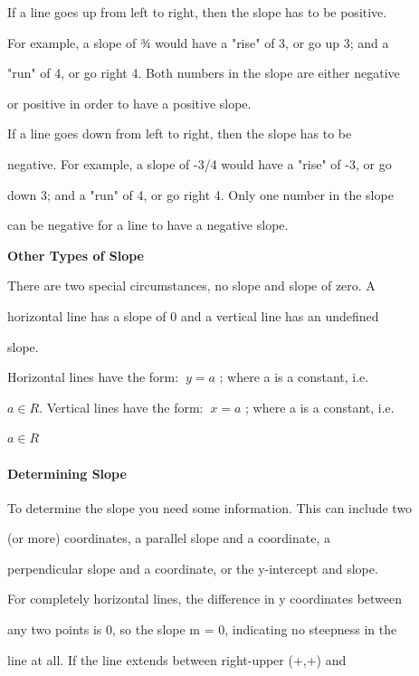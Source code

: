 If a line goes up from left to right, then the slope has to be positive.

For example, a slope of ¾ would have a "rise" of 3, or go up 3; and a

"run" of 4, or go right 4. Both numbers in the slope are either negative

or positive in order to have a positive slope.



If a line goes down from left to right, then the slope has to be

negative. For example, a slope of -3/4 would have a "rise" of -3, or go

down 3; and a "run" of 4, or go right 4. Only one number in the slope

can be negative for a line to have a negative slope.



\textbf{Other Types of Slope}



There are two special circumstances, no slope and slope of zero. A

horizontal line has a slope of 0 and a vertical line has an undefined

slope.



Horizontal lines have the form: $\ y = a$ ; where a is a constant, i.e.

$a \in R$. Vertical lines have the form: $\ x = a$ ; where a is a constant, i.e.

$a \in R$



\paragraph{Determining Slope}



To determine the slope you need some information. This can include two

(or more) coordinates, a parallel slope and a coordinate, a

perpendicular slope and a coordinate, or the y-intercept and slope.



For completely horizontal lines, the difference in y coordinates between

any two points is 0, so the slope m = 0, indicating no steepness in the

line at all. If the line extends between right-upper (+,+) and

